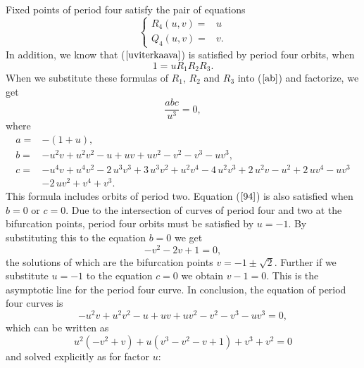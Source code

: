 \documentclass[12pt,a4paper]{amsart}
\numberwithin{equation}{section}
\numberwithin{lause}{section}
\begin{document}
Fixed points of period four satisfy the pair of equations
\begin{equation}
\left\{\begin{array}{ll}
      R_{4}(u,v)=&u \\
      Q_{4}(u,v)=&v.
\end{array}\right.  \label{91}
\end{equation}
In addition,  we know that ($\ref{uviterkaava}$) is satisfied by period four orbits, when
\begin{equation}
1=uR_{1}R_{2}R_{3}. \label{ab}
\end{equation}
When we substitute these formulas of $R_{1}$, $R_{2}$ and $R_{3}$ into ($\ref{ab}$) and factorize, we get
\begin{equation}
\frac{abc}{{u}^{3}}=0,\label{94}
\end{equation}
where
\begin{displaymath}
\begin{array}{ll}
      a=& -(1+u),\\
      b=&-{u}^{2}v+{u}^{2}{v}^{2}-u+uv+u{v
}^{2}-{v}^{2}-{v}^{3}-u{v}^{3}, \\
      c=&-{u}^{4}v+{u}^{4}{v}^{2
}-2\,{u}^{3}{v}^{3}+3\,{u}^{3}{v}^{2}+{u}^{2}{v}^{4}-4\,{u}^{2}{v}^{3}
+2\,{u}^{2}v-{u}^{2}+2\,u{v}^{4}-u{v}^{3} \\
&-2\,u{v}^{2}+{v}^{4}+{v}^{3}.
\end{array}
\end{displaymath}
This formula includes orbits of period two. Equation ($\ref{94}$) is also satisfied when $b=0$ or $c=0$.
Due to the intersection of curves of period four and two at the bifurcation points, period four orbits must be satisfied by $u=-1$.
By substituting this to the equation $b=0$ we get
\begin{displaymath}
-v^{2}-2v+1=0,
\end{displaymath}
the solutions of which are the bifurcation points $v=-1 \pm \sqrt{2}$. Further if we substitute $u=-1$ to the equation $c=0$ we obtain $v-1=0$. This is the asymptotic line for the period four curve. In conclusion, the equation of period four curves is
\begin{displaymath}
-{u}^{2}v+{u}^{2}{v}^{2}-u+uv+u{v
}^{2}-{v}^{2}-{v}^{3}-u{v}^{3}=0,
\end{displaymath}
which can be written as
\begin{equation}
u^{2}(-v^{2}+v)+u(v^{3}-v^{2}-v+1)+v^{3}+v^{2}=0 \label{11}
\end{equation}
and solved explicitly as for factor $u$:
\end{document}
